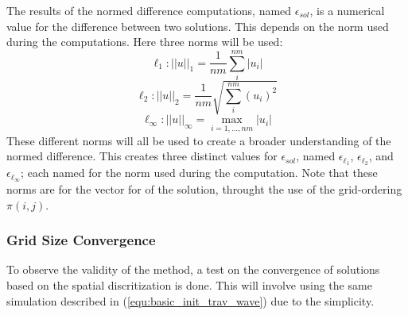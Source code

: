   The results of the normed difference computations, named $\epsilon_{sol}$, is a numerical value for the difference between two solutions.
  This depends on the norm used during the computations.
  Here three norms will be used:
  \begin{equation}  \label{equ:norm_l1}
    \ell_1: ||u||_1 = \frac{1}{nm} \sum_{i}^{nm} |u_{i}|
  \end{equation}
  \begin{equation}  \label{equ:norm_l2}
    \ell_2: ||u||_2 = \frac{1}{nm} \sqrt{\sum_{i}^{nm} (u_{i})^2}
  \end{equation}
  \begin{equation}  \label{equ:norm_linf}
    \ell_\infty: ||u||_\infty = \max_{i=1,\ldots,nm} |u_{i}|
  \end{equation}
  These different norms will all be used to create a broader understanding of the normed difference.
  This creates three distinct values for $\epsilon_{sol}$, named $\epsilon_{\ell_1}$, $\epsilon_{\ell_2}$, and $\epsilon_{\ell_\infty}$; each named for the norm used during the computation.
  Note that these norms are for the vector for of the solution, throught the use of the grid-ordering $\pi(i,j)$.
  

\subsubsection{Grid Size Convergence}
  To observe the validity of the method, a test on the convergence of solutions based on the spatial discritization is done.
  This will involve using the same simulation described in (\ref{equ:basic_init_trav_wave}) due to the simplicity. 
 
